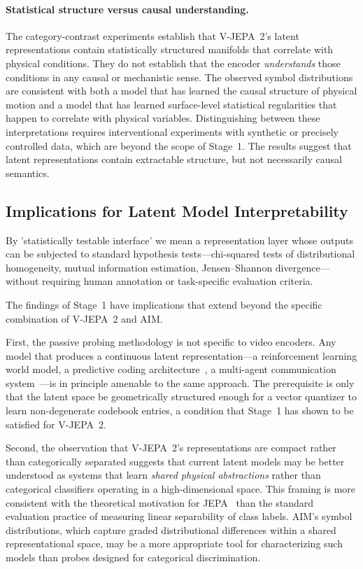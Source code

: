 \documentclass{article}
\begin{document}
\paragraph{Statistical structure versus causal understanding.}
The category-contrast experiments establish that V-JEPA~2's latent
representations contain statistically structured manifolds that
correlate with physical conditions.
They do not establish that the encoder \emph{understands} those
conditions in any causal or mechanistic sense.
The observed symbol distributions are consistent with both a model
that has learned the causal structure of physical motion and a model
that has learned surface-level statistical regularities that happen to
correlate with physical variables.
Distinguishing between these interpretations requires interventional
experiments with synthetic or precisely controlled data, which are
beyond the scope of Stage~1.
The results suggest that latent representations contain extractable
structure, but not necessarily causal semantics.

\subsection{Implications for Latent Model Interpretability}
By 'statistically testable interface' we mean a representation layer whose outputs can be subjected to standard hypothesis tests—chi-squared tests of distributional homogeneity, mutual information estimation, Jensen–Shannon divergence—without requiring human annotation or task-specific evaluation criteria.

The findings of Stage~1 have implications that extend beyond the
specific combination of V-JEPA~2 and AIM.

First, the passive probing methodology is not specific to video
encoders.
Any model that produces a continuous latent representation---a
reinforcement learning world model, a predictive coding
architecture~\cite{lecun2022path}, a multi-agent communication
system~\cite{liu2025aim}---is in principle amenable to the same
approach.
The prerequisite is only that the latent space be geometrically
structured enough for a vector quantizer to learn non-degenerate
codebook entries, a condition that Stage~1 has shown to be satisfied
for V-JEPA~2.

Second, the observation that V-JEPA~2's representations are compact
rather than categorically separated suggests that current latent
models may be better understood as systems that learn
\emph{shared physical abstractions} rather than categorical
classifiers operating in a high-dimensional space.
This framing is more consistent with the theoretical motivation for
JEPA~\cite{lecun2022path} than the standard evaluation practice of
measuring linear separability of class labels.
AIM's symbol distributions, which capture graded distributional
differences within a shared representational space, may be a more
appropriate tool for characterizing such models than probes designed
for categorical discrimination.
\end{document}
